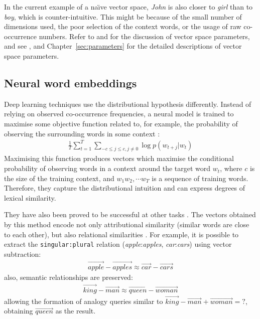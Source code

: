 In the current example of a na{\"\i}ve vector space, \textit{John} is also closer to \textit{girl} than to \textit{boy}, which is counter-intuitive. This might be because of the small number of dimensions used, the poor selection of the context words, or the usage of raw co-occurrence numbers. Refer to  and  for the discussion of vector space parameters, and see ,  and Chapter~\ref{sec:parameters} for the detailed descriptions of vector space parameters.

\subsection{Neural word embeddings}
\label{sec:neural-embedding}

Deep learning techniques use the distributional hypothesis differently. Instead of relying on observed co-occurrence frequencies, a neural model is trained to maximise some objective function related to, for example, the probability of observing the surrounding words in some context \cite{mikolov2013distributed}:
%
%
%
%
\begin{align}
 \frac{1}{T}\sum^{T}_{t=1}\sum_{-c \leq j \leq c, j\neq0} \log p(w_{t+j}|w_t)
  \label{eq:objective-func}
\end{align}
%
\noindent
Maximising this function produces vectors which maximise the
conditional probability of observing words in a context around the
target word $w_t$, where $c$ is the size of the training context, and
$w_1 w_2, \cdots w_T$ is a sequence of training words. Therefore, they
capture the distributional intuition and can express degrees of
lexical similarity.

They have also been proved to be successful at other tasks \cite{mikolov2013linguistic}. The vectors obtained by this method encode not only attributional similarity (similar words are close to each other), but also relational similarities \cite{Turney:2010:FMV:1861751.1861756}. For example, it is possible to extract the \texttt{singular:plural} relation (\textit{apple}:\textit{apples}, \textit{car}:\textit{cars}) using vector subtraction:
%
\begin{align*}
  \overrightarrow{\mathit{apple}} - \overrightarrow{\mathit{apples}}
  \approx
  \overrightarrow{\mathit{car}} - \overrightarrow{\mathit{cars}}
\end{align*}
%
also, semantic relationships are preserved:
%
\begin{align*}
  \overrightarrow{\mathit{king}} - \overrightarrow{\mathit{man}}
  \approx
  \overrightarrow{\mathit{queen}} - \overrightarrow{\mathit{woman}}
\end{align*}
%
allowing the formation of analogy queries similar to
$\overrightarrow{\mathit{king}} - \overrightarrow{\mathit{man}} +
\overrightarrow{\mathit{woman}} = \mathtt{?}$, obtaining
$\overrightarrow{\mathit{queen}}$ as the
result.

